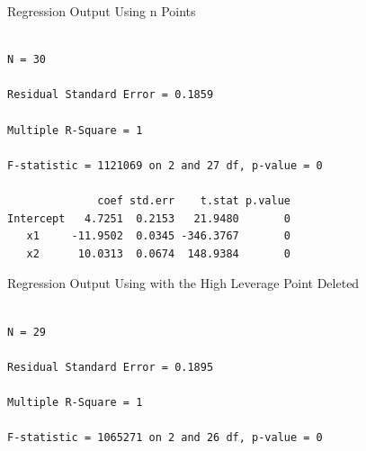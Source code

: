 {{%
\begin{figure}
\end{figure}
\begin{figure}
\end{figure}
\begin{figure}
\end{figure}
\begin{figure}
\end{figure}
\begin{figure}
\end{figure}
\clearpage
\newpage
\begin{center}
Regression Output Using n Points
\end{center}
{\large
\begin{verbatim}

N = 30

Residual Standard Error = 0.1859

Multiple R-Square = 1

F-statistic = 1121069 on 2 and 27 df, p-value = 0

              coef std.err    t.stat p.value 
Intercept   4.7251  0.2153   21.9480       0
   x1     -11.9502  0.0345 -346.3767       0
   x2      10.0313  0.0674  148.9384       0
\end{verbatim}
}
\vspace{0.5in}
\begin{center}
Regression Output Using with the High Leverage Point Deleted
\end{center}
{\large
\begin{verbatim}

N = 29

Residual Standard Error = 0.1895

Multiple R-Square = 1

F-statistic = 1065271 on 2 and 26 df, p-value = 0


\end{verbatim}}}}
